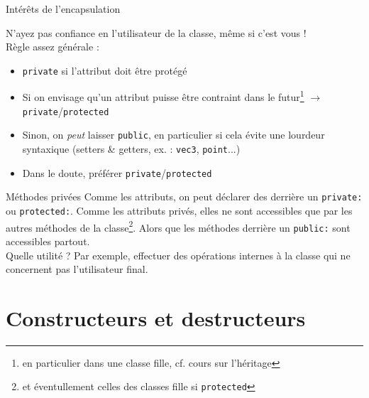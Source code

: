 \documentclass[c]{beamer}
\newcommand{\inline}[1]{\texttt{#1}}
\begin{document}

\begin{frame}[fragile]{Intérêts de l'encapsulation}

N'ayez pas confiance en l'utilisateur de la classe, même si c'est vous !\\

Règle assez générale :
\begin{itemize}[<+->]
\item \inline{private} si l'attribut doit être protégé
\item Si on envisage qu'un attribut puisse être contraint dans le futur\footnote{en particulier dans une classe fille, cf. cours sur l'héritage} $\rightarrow$ \inline{private}/\inline{protected}
\item Sinon, on \emph{peut} laisser \inline{public}, en particulier si cela évite une lourdeur syntaxique (setters \& getters, ex. : \texttt{vec3}, \texttt{point}...)
\item Dans le doute, préférer \inline{private}/\inline{protected}
\end{itemize}

\end{frame}


\begin{frame}[fragile]{Méthodes privées}
Comme les attributs, on peut déclarer des  derrière un \inline{private:} ou \inline{protected:}. Comme les attributs privés, elles ne sont accessibles que par les autres méthodes de la classe\footnote{et éventullement celles des classes fille si \inline{protected}}. Alors que les méthodes derrière un \inline{public:} sont accessibles partout.\\

Quelle utilité ? Par exemple, effectuer des opérations internes à la classe qui ne concernent pas l'utilisateur final.
\end{frame}


\part{Constructeurs et destructeurs}
\frame{\partpage}
\end{document}
